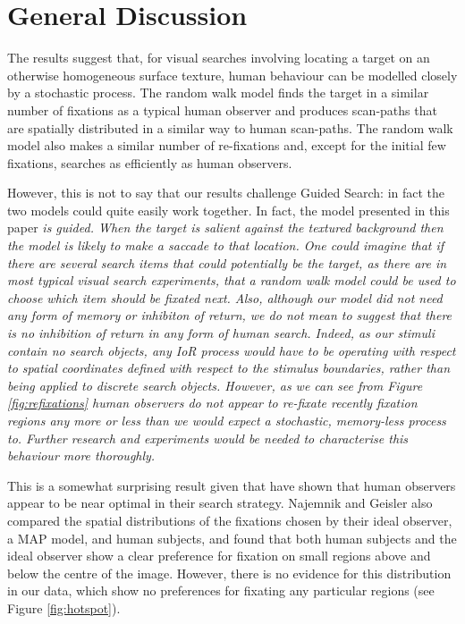 \section{General Discussion}

The results suggest that, for visual searches involving locating a target on an otherwise homogeneous surface texture, human behaviour can be modelled closely by a stochastic process. The random walk model finds the target in a similar number of fixations as a typical human observer and produces scan-paths that are spatially distributed in a similar way to human scan-paths. The random walk model also makes a similar number of re-fixations and, except for the initial few fixations, searches as efficiently as human observers. 
\par
However, this is not to say that our results challenge Guided Search: in fact the two models could quite easily work together. In fact, the model presented in this paper \itshape is \normalfont guided. When the target is salient against the textured background then the model is likely to make a saccade to that location. One could imagine that if there are several search items that could potentially be the target, as there are in most typical visual search experiments, that a random walk model could be used to choose which item should be fixated next. Also, although our model did not need any form of memory or inhibiton of return, we do not mean to suggest that there is no inhibition of return in any form of human search. Indeed, as our stimuli contain no search objects, any IoR process would have to be operating with respect to spatial coordinates defined with respect to the stimulus boundaries, rather than being applied to discrete search objects. However, as we can see from Figure \ref{fig:refixations} human observers do not appear to re-fixate recently fixation regions any more or less than we would expect a stochastic, memory-less process to. Further research and experiments would be needed to characterise this behaviour more thoroughly. 
\par
This is a somewhat surprising result given that \cite{najemnik-geisler2008} have shown that human observers appear to be near optimal in their search strategy. Najemnik and Geisler also compared the spatial distributions of the fixations chosen by their ideal observer, a MAP model, and human subjects, and found that both human subjects and the ideal observer show a clear preference for fixation on small regions above and below the centre of the image. However, there is no evidence for this distribution in our data, which show no preferences for fixating any particular regions (see Figure \ref{fig:hotspot}). 

